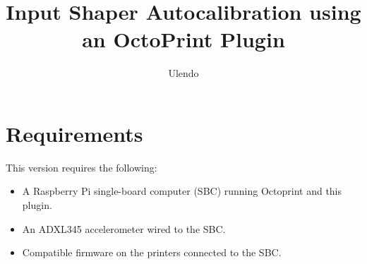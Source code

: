 \documentclass[12pt]{article}
\title{Input Shaper Autocalibration using an OctoPrint Plugin}
\author{Ulendo}
\date{\vspace{-5ex}} %
\begin{document}
\maketitle

\section{Requirements}
This version requires the following:
\begin{itemize}
	\item A Raspberry Pi single-board computer (SBC) running Octoprint and this plugin.
	\item An ADXL345 accelerometer wired to the SBC.
	\item Compatible firmware on the printers connected to the SBC.
\end{itemize}
\end{document}
